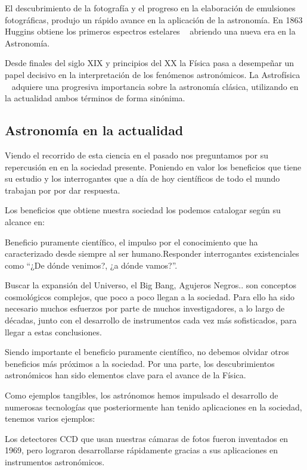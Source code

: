 \bigskip
El descubrimiento de la fotografía y el progreso en la elaboración de emulsiones fotográficas, produjo un rápido avance en la aplicación de la astronomía. En 1863 Huggins obtiene los primeros espectros estelares ~\cite{analisispectal} abriendo una nueva era en la Astronomía. ~\cite{huggins}


\bigskip
Desde finales del siglo XIX y principios del XX la Física pasa a desempeñar un papel decisivo en la interpretación de los fenómenos astronómicos. La Astrofísica ~\cite{astrofisica} adquiere una progresiva importancia sobre la astronomía clásica, utilizando en la actualidad ambos términos de forma sinónima.


\subsection{Astronomía en la actualidad}

Viendo el recorrido de esta ciencia en el pasado nos preguntamos por su repercusión en en la sociedad presente. Poniendo en valor los beneficios que tiene su estudio y los interrogantes que a día de hoy científicos de todo el mundo trabajan por por dar respuesta.  \cite{beneficiosastro}

\bigskip
Los beneficios que obtiene nuestra sociedad los podemos catalogar según su alcance en:


\bigskip
Beneficio puramente científico, el impulso por el conocimiento que ha caracterizado desde siempre al ser humano.Responder interrogantes existenciales como “¿De dónde venimos?, ¿a dónde vamos?”.

\bigskip
Buscar la expansión del Universo, el Big Bang, Agujeros Negros.. son conceptos cosmológicos complejos, que poco a poco  llegan a la sociedad.
 Para ello ha sido necesario  muchos esfuerzos por parte de muchos investigadores, a lo largo de décadas, junto con el desarrollo de instrumentos cada vez más sofisticados, para llegar a estas conclusiones. 

\bigskip
Siendo importante el beneficio puramente científico, no debemos olvidar otros beneficios más próximos a la sociedad. Por una parte, los descubrimientos astronómicos han sido elementos clave para el avance de la Física. 

\bigskip
Como ejemplos tangibles, los astrónomos hemos impulsado el desarrollo de numerosas tecnologías que posteriormente han tenido aplicaciones en la sociedad, tenemos varios ejemplos:   \cite{beneficiosastro2}

\bigskip
Los detectores CCD que usan nuestras cámaras de fotos fueron inventados en 1969, pero lograron desarrollarse rápidamente gracias a sus aplicaciones en instrumentos astronómicos. \newline
 
